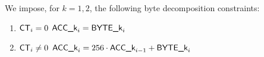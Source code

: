 We impose, for $k = 1, 2$, the following byte decomposition constraints:
\begin{enumerate}[resume]
	\item \If $\textsf{CT}_{i} = 0$ \Then $\textsf{ACC}\textsf{\_k}_{i} = \textsf{BYTE}\textsf{\_k}_{i}$
	\item \If $\textsf{CT}_{i} \neq 0$ \Then $\textsf{ACC}\textsf{\_k}_{i} = 256 \cdot \textsf{ACC}\textsf{\_k}_{i - 1} + \textsf{BYTE}\textsf{\_k}_{i}$
\end{enumerate}
